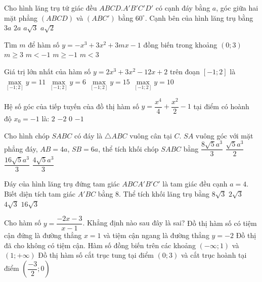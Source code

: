 \begin{ex}%
Cho hình lăng trụ tứ giác đều $ABCD.A'B'C'D'$ có cạnh đáy bằng $a$, góc giữa hai mặt phẳng $(ABCD)$ và $(ABC')$ bằng $60^{\circ}$. Cạnh bên của hình lăng trụ bằng
\choice
{$3a$}
{$2a$}
{\True $a\sqrt{3}$}
{$a\sqrt{2}$}
\end{ex}

\begin{ex}%
Tìm $m$ để hàm số $y=-x^3+3x^2+3mx-1$ đồng biến trong khoảng $(0;3)$
\choice
{\True $m \geq 3$}
{$m<-1$}
{$m \geq -1$}
{$m<3$}
\end{ex}

\begin{ex}%
Giá trị lớn nhất của hàm số $y=2x^3+3x^2-12x+2$ trên đoạn $[-1;2]$ là
\choice
{$\max \limits_{[-1;2]} y =11$}
{$\max \limits_{[-1;2]} y =6$}
{\True $\max \limits_{[-1;2]} y =15$}
{$\max \limits_{[-1;2]} y =10$}
\end{ex}


\begin{ex}%
Hệ số góc của tiếp tuyến của đồ thị hàm số $y=\dfrac{x^4}{4}+\dfrac{x^2}{2}-1$ tại điểm có hoành độ $x_0=-1$ là:
\choice
{$2$}
{\True $-2$}
{$0$}
{$-1$}
\end{ex}

\begin{ex}%
Cho hình chóp $S ABC$ có đáy là $\bigtriangleup ABC$ vuông cân tại $C$. $SA$ vuông góc với mặt phẳng đáy, $AB=4a$, $SB=6a$, thể tích khối chóp $S ABC$ bằng
\choice
{\True $\dfrac{8\sqrt{5}a^3}{3}$}
{$\dfrac{\sqrt{5}a^3}{2}$}
{$\dfrac{16\sqrt{5}a^3}{3}$}
{$\dfrac{4\sqrt{5}a^3}{3}$}
\end{ex}


\begin{ex}%
Đáy của hình lăng trụ đứng tam giác $ABCA'B'C'$ là tam giác đều cạnh $a=4$. Biết diện tích tam giác $A'BC$ bằng $8$. Thể tích khối lăng trụ bằng
\choice
{\True $8\sqrt{3}$}
{$2\sqrt{3}$}
{$4\sqrt{3}$}
{$16\sqrt{3}$}
\end{ex}

\begin{ex}%
Cho hàm số $y=\dfrac{-2x-3}{x-1}$. Khẳng định nào sau đây là sai?
\choice
{Đồ thị hàm số có tiệm cận đứng là đường thẳng $x=1$ và tiệm cận ngang là đường thẳng $y=-2$}
{\True Đồ thị đã cho không có tiệm cận.}
{Hàm số đồng biến trên các khoảng $(-\infty; 1)$ và $(1;+\infty)$}
{Đồ thị hàm số cắt trục tung tại điểm $(0; 3)$ và cắt trục hoành tại điểm $\left(\dfrac{-3}{2}; 0\right)$}
\end{ex}

